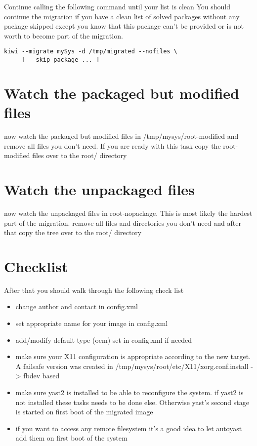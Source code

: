 Continue calling the following command until your list is clean
You should continue the migration if you have a clean list of solved
packages without any package skipped except you know that this package
can't be provided or is not worth to become part of the migration.

\begin{Command}{14cm}
\begin{verbatim}
kiwi --migrate mySys -d /tmp/migrated --nofiles \
     [ --skip package ... ]
\end{verbatim}
\end{Command}

\section{Watch the packaged but modified files}
now watch the packaged but modified files in /tmp/mysys/root-modified
and remove all files you don't need. If you are ready with this task
copy the root-modified files over to the root/ directory

\section{Watch the unpackaged files}
now watch the unpackaged files in root-nopackage. This is most likely
the hardest part of the migration. remove all files and directories
you don't need and after that copy the tree over to the root/ directory

\section{Checklist}
After that you should walk through the following check list

\begin{itemize}
\item change author and contact in config.xml
\item set appropriate name for your image in config.xml
\item add/modify default type (oem) set in config.xml if needed
\item make sure your X11 configuration is appropriate according to
      the new target. A failsafe version was created in
      /tmp/mysys/root/etc/X11/xorg.conf.install -> fbdev based
\item make sure yast2 is installed to be able to reconfigure
      the system. if yast2 is not installed these tasks needs to
      be done else. Otherwise yast's second stage is started on first
      boot of the migrated image
\item if you want to access any remote filesystem it's a good
      idea to let autoyast add them on first boot of the system
\end{itemize}

